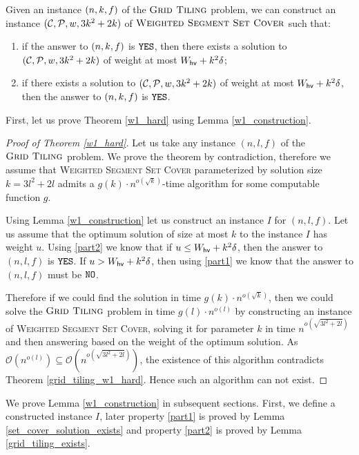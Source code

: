 \begin{lemma}
\label{w1_construction}
Given an instance $(n,k,f)$ of the $\textsc{Grid Tiling}$ problem,
we can construct an instance $(\mathcal{C}, \mathcal{P}, w, 3k^2+2k)$ of $\textsc{Weighted Segment Set Cover}$
such that:
\begin{enumerate}[label={(\arabic*)}]
\item \label{part1} if the answer to $(n,k,f)$ is $\texttt{YES}$, then there exists a solution
to $(\mathcal{C}, \mathcal{P}, w, 3k^2+2k)$ of weight at most $W_{\mathsf{hv}}+k^2\delta$;
\item \label{part2} if there exists a solution to $(\mathcal{C}, \mathcal{P}, w, 3k^2+2k)$ of weight at most $W_{\mathsf{hv}}+k^2\delta$,
then the answer to $(n,k,f)$ is $\texttt{YES}$.
\end{enumerate}
\end{lemma}


First, let us prove Theorem \ref{w1_hard} using Lemma \ref{w1_construction}.

\begin{proof}[Proof of Theorem \ref{w1_hard}]
Let us take any instance $(n,l,f)$ of the $\textsc{Grid Tiling}$ problem.
We prove the theorem by contradiction, therefore we assume
that \textsc{Weighted} \textsc{Segment} \textsc{Set} \textsc{Cover}
parameterized by solution size $k = 3l^2+2l$ admits a
$g(k)\cdot n^{o(\sqrt{k})}$-time algorithm for some computable function $g$.

Using Lemma \ref{w1_construction} let us construct an instance $I$
for $(n,l,f)$.
Let us assume that the optimum solution of size at most $k$
to the instance $I$ has weight $u$.
Using \ref{part2} we know that if $u \le W_{\mathsf{hv}}+k^2\delta$,
then the answer to $(n,l,f)$ is $\texttt{YES}$.
If $u > W_{\mathsf{hv}}+k^2\delta$, then using \ref{part1}
we know that the answer to $(n,l,f)$ must be $\texttt{NO}$.

Therefore if we could find the solution in time $g(k) \cdot n^{o(\sqrt{k})}$,
then we could solve the $\textsc{Grid Tiling}$ problem
in time $g(l)\cdot n^{o(l)}$ by constructing an instance of
\textsc{Weighted} \textsc{Segment} \textsc{Set} \textsc{Cover}, solving it 
for parameter $k$ in time $n^{o(\sqrt{3l^2+2l})}$
and then answering based on the weight
of the optimum solution.
As $\mathcal{O}(n^{o(l)}) \subseteq \mathcal{O}(n^{o(\sqrt{3l^2+2l})})$,
the existence of this algorithm contradicts Theorem
\ref{grid_tiling_w1_hard}.
Hence such an algorithm can not exist.
\end{proof}

We prove Lemma \ref{w1_construction} in subsequent sections.
First, we define a constructed instance $I$, later property
\ref{part1} is proved by Lemma \ref{set_cover_solution_exists}
and property \ref{part2} is proved by Lemma \ref{grid_tiling_exists}.

